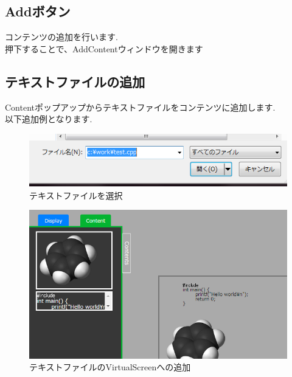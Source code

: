 \documentclass[a4paper,10pt,oneside]{jsbook}
\begin{document}
\subsection{Addボタン}
コンテンツの追加を行います.\\
押下することで、AddContentウィンドウを開きます



\subsection{テキストファイルの追加}
Contentポップアップからテキストファイルをコンテンツに追加します.\\
以下追加例となります.\\

\begin{figure}[htbp]
	\begin{center}
		\includegraphics[width=11.5cm]{image/AddContent_TextFile_Select.png}
	\end{center}
	\caption{テキストファイルを選択}
	\label{fig:home}
\end{figure}


\begin{figure}[htbp]
	\begin{center}
		\includegraphics[width=15.5cm]{image/AddContent_TextFile_View.png}
	\end{center}
	\caption{テキストファイルのVirtualScreenへの追加}
	\label{fig:addtextfile}
\end{figure}
\end{document}
